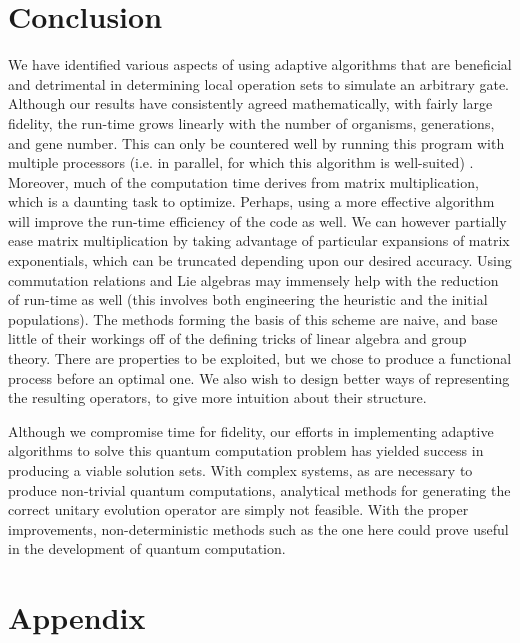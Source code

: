 \documentclass[11pt,twocolumn]{article}
\begin{document}
	\section{Conclusion}

We have identified various aspects of using adaptive algorithms that are beneficial and detrimental in determining local operation sets to simulate an arbitrary gate. Although our results have consistently agreed mathematically, with fairly large fidelity, the run-time grows linearly with the number of organisms, generations, and gene number. This can only be countered well by running this program with multiple processors (i.e. in parallel, for which this algorithm is well-suited) \cite{umbarkar}. Moreover, much of the computation time derives from matrix multiplication, which is a daunting task to optimize. Perhaps, using a more effective algorithm will improve the run-time efficiency of the code as well. We can however partially ease matrix multiplication by taking advantage of particular expansions of matrix exponentials, which can be truncated depending upon our desired accuracy. Using commutation relations and Lie algebras may immensely help with the reduction of run-time as well (this involves both engineering the heuristic and the initial populations). The methods forming the basis of this scheme are naive, and base little of their workings off of the defining tricks of linear algebra and group theory. There are properties to be exploited, but we chose to produce a functional process before an optimal one. We also wish to design better ways of representing the resulting operators, to give more intuition about their structure. %

Although we compromise time for fidelity, our efforts in implementing adaptive algorithms to solve this quantum computation problem has yielded success in producing a viable solution sets. With complex systems, as are necessary to produce non-trivial quantum computations, analytical methods for generating the correct unitary evolution operator are simply not feasible. With the proper improvements, non-deterministic methods such as the one here could prove useful in the development of quantum computation. 


	\section{Appendix} \label{appendix}
\end{document}
